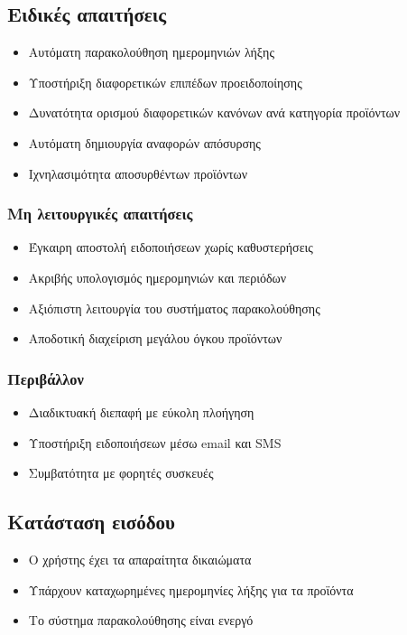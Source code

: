 \documentclass[12pt,a4paper,twoside]{book}
\begin{document}
\subsection{Ειδικές απαιτήσεις}
\begin{itemize}
  \item Αυτόματη παρακολούθηση ημερομηνιών λήξης
  \item Υποστήριξη διαφορετικών επιπέδων προειδοποίησης
  \item Δυνατότητα ορισμού διαφορετικών κανόνων ανά κατηγορία προϊόντων
  \item Αυτόματη δημιουργία αναφορών απόσυρσης
  \item Ιχνηλασιμότητα αποσυρθέντων προϊόντων
\end{itemize}

\subsubsection{Μη λειτουργικές απαιτήσεις}
\begin{itemize}
  \item Έγκαιρη αποστολή ειδοποιήσεων χωρίς καθυστερήσεις
  \item Ακριβής υπολογισμός ημερομηνιών και περιόδων
  \item Αξιόπιστη λειτουργία του συστήματος παρακολούθησης
  \item Αποδοτική διαχείριση μεγάλου όγκου προϊόντων
\end{itemize}

\subsubsection{Περιβάλλον}
\begin{itemize}
  \item Διαδικτυακή διεπαφή με εύκολη πλοήγηση
  \item Υποστήριξη ειδοποιήσεων μέσω email και SMS
  \item Συμβατότητα με φορητές συσκευές
\end{itemize}

\subsection{Κατάσταση εισόδου}
\begin{itemize}
  \item Ο χρήστης έχει τα απαραίτητα δικαιώματα
  \item Υπάρχουν καταχωρημένες ημερομηνίες λήξης για τα προϊόντα
  \item Το σύστημα παρακολούθησης είναι ενεργό
\end{itemize}
\end{document}
